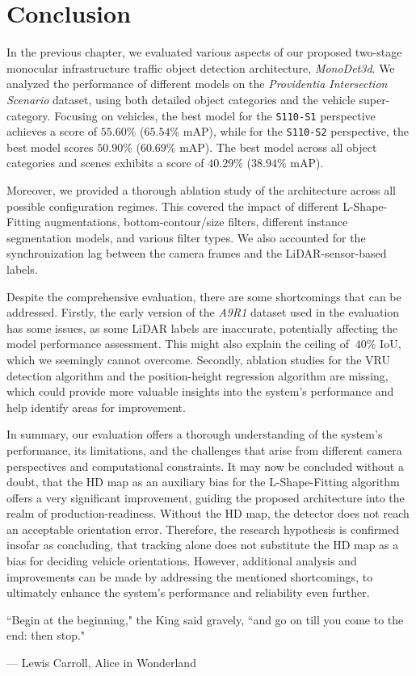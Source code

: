 
\chapter{Conclusion}
\label{ch:conclusion}

In the previous chapter, we evaluated various aspects of our proposed two-stage monocular infrastructure traffic object detection architecture, \textit{MonoDet3d}.
We analyzed the performance of different models on the \textit{Providentia Intersection Scenario} dataset, using both detailed object categories and the vehicle super-category.
Focusing on vehicles, the best model for the \texttt{S110-S1} perspective achieves a score of $55.60\%$ ($65.54\%$ mAP), while for the \texttt{S110-S2} perspective, the best model scores $50.90\%$ ($60.69\%$ mAP).
The best model across all object categories and scenes exhibits a score of $40.29\%$ ($38.94\%$ mAP).

Moreover, we provided a thorough ablation study of the architecture across all possible configuration regimes.
This covered the impact of different L-Shape-Fitting augmentations, bottom-contour/size filters, different instance segmentation models, and various filter types.
We also accounted for the synchronization lag between the camera frames and the LiDAR-sensor-based labels.

Despite the comprehensive evaluation, there are some shortcomings that can be addressed.
Firstly, the early version of the \textit{A9R1} dataset used in the evaluation has some issues, as some LiDAR labels are inaccurate, potentially affecting the model performance assessment.
This might also explain the ceiling of $~40\%$ IoU, which we seemingly cannot overcome.
Secondly, ablation studies for the VRU detection algorithm and the position-height regression algorithm are missing, which could provide more valuable insights into the system's performance and help identify areas for improvement.

In summary, our evaluation offers a thorough understanding of the system's performance, its limitations, and the challenges that arise from different camera perspectives and computational constraints.
It may now be concluded without a doubt, that the HD map as an auxiliary bias for the L-Shape-Fitting algorithm offers a very significant improvement, guiding the proposed architecture into the realm of production-readiness.
Without the HD map, the detector does not reach an acceptable orientation error.
Therefore, the research hypothesis is confirmed insofar as concluding, that tracking alone does not substitute the HD map as a bias for deciding vehicle orientations.
However, additional analysis and improvements can be made by addressing the mentioned shortcomings, to ultimately enhance the system's performance and reliability even further.

\par\vspace*{\fill}
\epigraph{``Begin at the beginning," the King said gravely, ``and go on till you come to the end: then stop."}{--- \textup{Lewis Carroll}, Alice in Wonderland}
